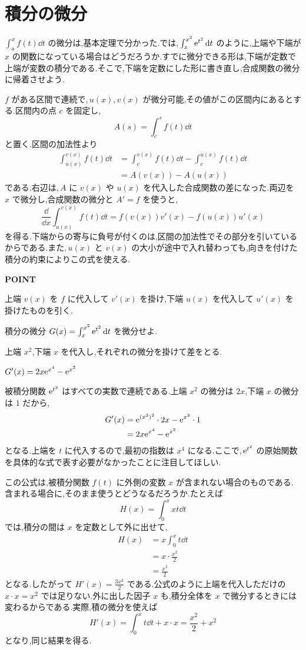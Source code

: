 \section{積分の微分}\label{節:変数上下端}
$\int_a^x f(t)\dd t$ の微分は,基本定理で分かった.では,\,$\int_x^{x^2}\mathrm{e}^{t^2}\,\mathrm{d} t$ のように,上端や下端が $x$ の関数になっている場合はどうだろうか.すでに微分できる形は,下端が定数で上端が変数の積分である.そこで,下端を定数にした形に書き直し,合成関数の微分に帰着させよう.

$f$ がある区間で連続で,\,$u(x),v(x)$ が微分可能,その値がこの区間内にあるとする.区間内の点 $c$ を固定し,
\[
 A(s)=\int_c^s f(t)\dd t
\]
と置く.区間の加法性より
\begin{align*}
 \int_{u(x)}^{v(x)}f(t)\dd t
 &=\int_c^{v(x)}f(t)\dd t-\int_c^{u(x)}f(t)\dd t\\
 &=A(v(x))-A(u(x))
\end{align*}
である.右辺は,\,$A$ に $v(x)$ や $u(x)$ を代入した合成関数の差になった.両辺を $x$ で微分し,合成関数の微分と $A'=f$ を使うと,
\[
 \boxed{\frac{\dd}{\dd x}\int_{u(x)}^{v(x)}f(t)\dd t
 =f(v(x))v'(x)-f(u(x))u'(x)}
\]
を得る.下端からの寄与に負号が付くのは,区間の加法性でその部分を引いているからである.また,\,$u(x)$ と $v(x)$ の大小が途中で入れ替わっても,向きを付けた積分の約束によりこの式を使える.

\begin{bookpoint}
\textbf{POINT}\par
上端 $v(x)$ を $f$ に代入して $v'(x)$ を掛け,下端 $u(x)$ を代入して $u'(x)$ を掛けたものを引く.
\end{bookpoint}

\begin{example}{積分の微分}
$G(x)=\int_x^{x^2}\mathrm{e}^{t^2}\,\mathrm{d} t$ を微分せよ.
\end{example}
上端 $x^2$,下端 $x$ を代入し,それぞれの微分を掛けて差をとる.

$G'(x)=2x\mathrm{e}^{x^4}-\mathrm{e}^{x^2}$

被積分関数 $\mathrm{e}^{t^2}$ はすべての実数で連続である.上端 $x^2$ の微分は $2x$,下端 $x$ の微分は $1$ だから,
\begin{align*}
 G'(x)&=\mathrm{e}^{(x^2)^2}\cdot2x-\mathrm{e}^{x^2}\cdot1\\
 &=2x\mathrm{e}^{x^4}-\mathrm{e}^{x^2}
\end{align*}
となる.上端を $t$ に代入するので,最初の指数は $x^4$ になる.ここで,\,$\mathrm{e}^{t^2}$ の原始関数を具体的な式で表す必要がなかったことに注目してほしい.

この公式は,被積分関数 $f(t)$ に外側の変数 $x$ が含まれない場合のものである.含まれる場合に,そのまま使うとどうなるだろうか.たとえば
\[
 H(x)=\int_0^x xt\dd t
\]
では,積分の間は $x$ を定数として外に出せて,
\begin{align*}
 H(x)&=x\int_0^x t\dd t\\
 &=x\cdot\frac{x^2}{2}\\
 &=\frac{x^3}{2}
\end{align*}
となる.したがって $H'(x)=\frac{3x^2}{2}$ である.公式のように上端を代入しただけの $x\cdot x=x^2$ では足りない.外に出した因子 $x$ も,積分全体を $x$ で微分するときには変わるからである.実際,積の微分を使えば
\[
 H'(x)=\int_0^x t\dd t+x\cdot x=\frac{x^2}{2}+x^2
\]
となり,同じ結果を得る.
